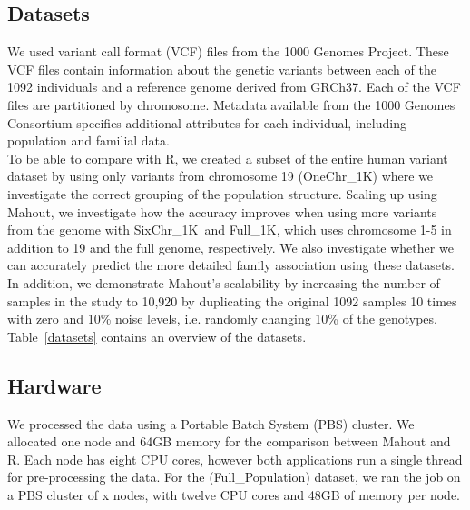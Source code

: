 \documentclass[twocolumn]{bmcart}%
\newcommand{\FullPop}{Full\_Population}
\newcommand{\OneReal}{OneChr\_1K}
\newcommand{\SixReal}{SixChr\_1K}
\newcommand{\FullReal}{Full\_1K}
\begin{document}
\subsection*{Datasets}
We used variant call format (VCF) files from the 1000 Genomes Project.
These VCF files contain information about the genetic variants between each of the 1092 individuals and a reference genome derived from GRCh37. 
Each of the VCF files are partitioned by chromosome.
Metadata available from the 1000 Genomes Consortium specifies additional attributes for each individual, including population and familial data.\\
To be able to compare with R, we created a subset of the entire human variant dataset by using only variants from chromosome 19 (\OneReal ) where we investigate the correct grouping of the population structure. 
Scaling up using Mahout, we investigate how the accuracy improves when using more variants from the genome with \SixReal\ and \FullReal, which uses chromosome 1-5 in addition to 19 and the full genome, respectively. 
We also investigate whether we can accurately predict the more detailed family association using these datasets. 
In addition, we demonstrate Mahout's scalability by increasing the number of samples in the study to 10,920 by duplicating the original 1092 samples 10 times with zero and 10\% noise levels, i.e. randomly changing 10\% of the genotypes. 
Table~\ref{datasets} contains an overview of the datasets.

\subsection*{Hardware}
We processed the data using a Portable Batch System (PBS) cluster. We allocated one node and 64GB memory for the comparison between Mahout and R.
Each node has eight CPU cores, however both applications run a single thread for pre-processing the data.
For the (\FullPop) dataset, we ran the job on a PBS cluster of x nodes, with twelve CPU cores and 48GB of memory per node.
\end{document}
